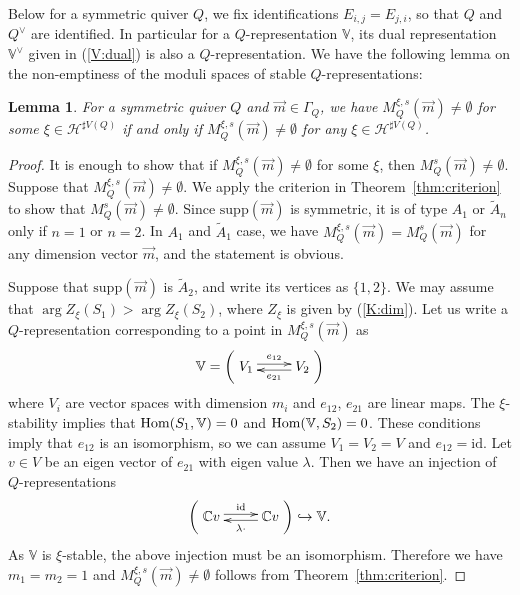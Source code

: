 \documentclass[11pt]{amsart}
\theoremstyle{plain}
\newtheorem{lem}[thm]{Lemma}
\theoremstyle{definition}
\theoremstyle{remark}
\newcommand{\hH}{\mathcal{H}}
\newcommand{\Hom}{\mathop{\rm Hom}\nolimits}
\newcommand{\id}{\textrm{id}}
\begin{document}
Below for a symmetric quiver $Q$, we 
fix identifications $E_{i, j}=E_{j, i}$, so 
that $Q$ and $Q^{\vee}$ are identified. 
In particular for a $Q$-representation 
$\mathbb{V}$, its dual representation 
$\mathbb{V}^{\vee}$ given in (\ref{V:dual}) is also a
$Q$-representation. 
We have the following lemma on the 
non-emptiness of the moduli spaces of stable
$Q$-representations: 
\begin{lem}\label{lem:slop}
For a symmetric quiver $Q$
and $\vec{m} \in \Gamma_Q$, we have 
$M_Q^{\xi, s}(\vec{m}) \neq \emptyset$
for some $\xi \in \hH^{\sharp V(Q)}$ 
if and only if $M_Q^{\xi, s}(\vec{m}) \neq \emptyset$
for any $\xi \in \hH^{\sharp V(Q)}$.  
\end{lem}
\begin{proof}
It is enough to show that 
if $M_Q^{\xi, s}(\vec{m}) \neq \emptyset$ 
for some $\xi$, 
then $M_Q^{s}(\vec{m}) \neq \emptyset$. 
Suppose that $M_Q^{\xi, s}(\vec{m}) \neq \emptyset$. 
We apply the criterion in Theorem~\ref{thm:criterion}
to show that $M_Q^s(\vec{m}) \neq \emptyset$. 
Since $\mathrm{supp}(\vec{m})$ is symmetric, 
it is of type $A_1$ or $\widetilde{A}_n$
only if $n=1$ or $n=2$. 
In $A_1$ and $\widetilde{A}_1$ case, 
we have $M_Q^{\xi, s}(\vec{m})=M_Q^{s}(\vec{m})$
for any dimension vector $\vec{m}$, 
and the statement is obvious. 

Suppose that $\mathrm{supp}(\vec{m})$ is 
$\widetilde{A}_2$, and write its 
vertices as $\{1, 2\}$. 
We may assume
that $\arg Z_{\xi}(S_1)>\arg Z_{\xi}(S_2)$, 
where $Z_{\xi}$ is given by (\ref{K:dim}). 
Let us write a $Q$-representation 
corresponding to a point
in $M_Q^{\xi, s}(\vec{m})$
as
\begin{align}\notag
\mathbb{V}=
\left(\xymatrix{
V_1 \ar@<0.5ex>[r]^-{e_{12}}& V_2 \ar@<0.5ex>[l]^-{e_{21}}
}\right)
\end{align}
where $V_i$ are vector spaces with dimension $m_i$
and $e_{12}$, $e_{21}$ are linear maps. 
The $\xi$-stability implies that
$\Hom(S_1, \mathbb{V})=0$ and $\Hom(\mathbb{V}, S_2)=0$.
These conditions imply that $e_{12}$ is an isomorphism, 
so we can assume $V_1=V_2=V$ and $e_{12}=\id$. 
Let $v \in V$ be an eigen vector of $e_{21}$
with eigen value $\lambda$. 
Then we have an injection of $Q$-representations
\begin{align*}
\left(\xymatrix{
\mathbb{C}v \ar@<0.5ex>[r]^-{\id}& \mathbb{C}v
 \ar@<0.5ex>[l]^-{\lambda \cdot}
}\right)
\hookrightarrow \mathbb{V}.
\end{align*}
As $\mathbb{V}$ is $\xi$-stable, 
the above injection must be an isomorphism. 
Therefore we have $m_1=m_2=1$
and $M_Q^{\xi, s}(\vec{m}) \neq \emptyset$
follows from Theorem~\ref{thm:criterion}. 


\end{proof}
\end{document}
